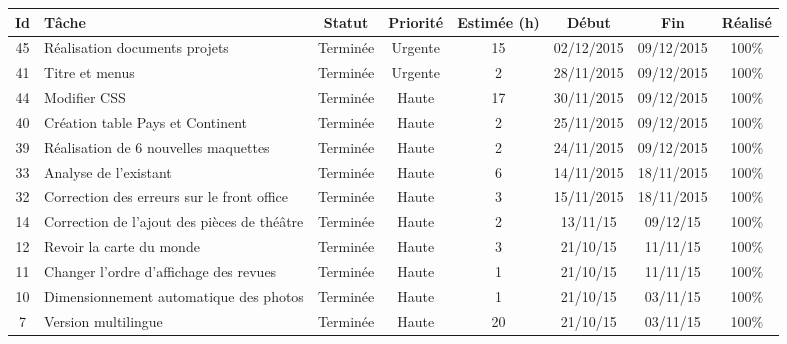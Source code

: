 \begin{tabular}{ | c | p{4cm} | c | c | c | c | c | c |  }
\hline 
Id & Tâche & Statut & Priorité & Estimée (h) & Début & Fin & Réalisé \\ \hline

45 & Réalisation documents projets & Terminée & Urgente & 15 & 02/12/2015 &
09/12/2015 & 100\% \\ \hline
 41 & Titre et menus & Terminée & Urgente &  2 & 28/11/2015 & 09/12/2015 & 100\%
 \\
 \hline
	
44 & Modifier CSS & Terminée & Haute &  17 & 30/11/2015 & 09/12/2015 & 100\% \\
\hline
 40 & Création table Pays et Continent & Terminée & Haute &  2 & 25/11/2015 &
09/12/2015 & 100\% \\ \hline
 39 & Réalisation de 6 nouvelles maquettes & Terminée & Haute &  2 & 24/11/2015 &
 09/12/2015 & 100\% \\ \hline 
 33 & Analyse de l'existant & Terminée & Haute &  6 & 14/11/2015 & 18/11/2015 &
  100\% \\ \hline
 32 & Correction des erreurs sur le front office & Terminée & Haute & 3
	& 15/11/2015 & 18/11/2015 & 100\% \\ \hline
14 & Correction de l'ajout des pièces de théâtre & Terminée & Haute & 2 &
	13/11/15 & 09/12/15 & 100\%  \\ \hline
12 & Revoir la carte du monde & Terminée & Haute & 3 & 21/10/15 & 11/11/15 &
100\% \\ \hline
11 & Changer l'ordre d'affichage des revues & Terminée & Haute & 1 & 21/10/15
	& 11/11/15 & 100\% \\ \hline
10 & Dimensionnement automatique des photos & Terminée & Haute & 1 & 21/10/15
	& 03/11/15 & 100\% \\ \hline
7 & Version multilingue & Terminée & Haute & 20 & 21/10/15 & 03/11/15 & 100\% 
\\
\hline




\end{tabular}
